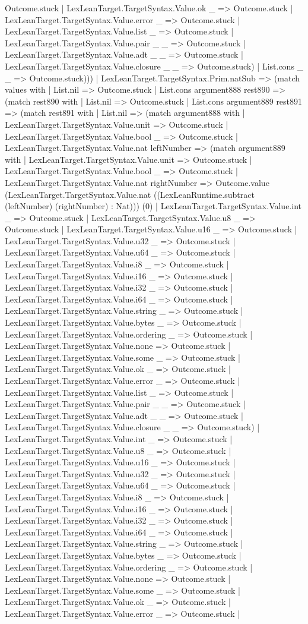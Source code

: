 \documentclass[11pt]{article}
\begin{document}
Outcome.stuck | LexLeanTarget.TargetSyntax.Value.ok \_ => Outcome.stuck | LexLeanTarget.TargetSyntax.Value.error \_ => Outcome.stuck | LexLeanTarget.TargetSyntax.Value.list \_ => Outcome.stuck | LexLeanTarget.TargetSyntax.Value.pair \_ \_ => Outcome.stuck | LexLeanTarget.TargetSyntax.Value.adt \_ \_ => Outcome.stuck | LexLeanTarget.TargetSyntax.Value.closure \_ \_ => Outcome.stuck) | List.cons \_ \_ => Outcome.stuck))) | LexLeanTarget.TargetSyntax.Prim.natSub => (match values with | List.nil => Outcome.stuck | List.cons argument888 rest890 => (match rest890 with | List.nil => Outcome.stuck | List.cons argument889 rest891 => (match rest891 with | List.nil => (match argument888 with | LexLeanTarget.TargetSyntax.Value.unit => Outcome.stuck | LexLeanTarget.TargetSyntax.Value.bool \_ => Outcome.stuck | LexLeanTarget.TargetSyntax.Value.nat leftNumber => (match argument889 with | LexLeanTarget.TargetSyntax.Value.unit => Outcome.stuck | LexLeanTarget.TargetSyntax.Value.bool \_ => Outcome.stuck | LexLeanTarget.TargetSyntax.Value.nat rightNumber => Outcome.value (LexLeanTarget.TargetSyntax.Value.nat ((LexLeanRuntime.subtract (leftNumber) (rightNumber) : Nat))) (0) | LexLeanTarget.TargetSyntax.Value.int \_ => Outcome.stuck | LexLeanTarget.TargetSyntax.Value.u8 \_ => Outcome.stuck | LexLeanTarget.TargetSyntax.Value.u16 \_ => Outcome.stuck | LexLeanTarget.TargetSyntax.Value.u32 \_ => Outcome.stuck | LexLeanTarget.TargetSyntax.Value.u64 \_ => Outcome.stuck | LexLeanTarget.TargetSyntax.Value.i8 \_ => Outcome.stuck | LexLeanTarget.TargetSyntax.Value.i16 \_ => Outcome.stuck | LexLeanTarget.TargetSyntax.Value.i32 \_ => Outcome.stuck | LexLeanTarget.TargetSyntax.Value.i64 \_ => Outcome.stuck | LexLeanTarget.TargetSyntax.Value.string \_ => Outcome.stuck | LexLeanTarget.TargetSyntax.Value.bytes \_ => Outcome.stuck | LexLeanTarget.TargetSyntax.Value.ordering \_ => Outcome.stuck | LexLeanTarget.TargetSyntax.Value.none => Outcome.stuck | LexLeanTarget.TargetSyntax.Value.some \_ => Outcome.stuck | LexLeanTarget.TargetSyntax.Value.ok \_ => Outcome.stuck | LexLeanTarget.TargetSyntax.Value.error \_ => Outcome.stuck | LexLeanTarget.TargetSyntax.Value.list \_ => Outcome.stuck | LexLeanTarget.TargetSyntax.Value.pair \_ \_ => Outcome.stuck | LexLeanTarget.TargetSyntax.Value.adt \_ \_ => Outcome.stuck | LexLeanTarget.TargetSyntax.Value.closure \_ \_ => Outcome.stuck) | LexLeanTarget.TargetSyntax.Value.int \_ => Outcome.stuck | LexLeanTarget.TargetSyntax.Value.u8 \_ => Outcome.stuck | LexLeanTarget.TargetSyntax.Value.u16 \_ => Outcome.stuck | LexLeanTarget.TargetSyntax.Value.u32 \_ => Outcome.stuck | LexLeanTarget.TargetSyntax.Value.u64 \_ => Outcome.stuck | LexLeanTarget.TargetSyntax.Value.i8 \_ => Outcome.stuck | LexLeanTarget.TargetSyntax.Value.i16 \_ => Outcome.stuck | LexLeanTarget.TargetSyntax.Value.i32 \_ => Outcome.stuck | LexLeanTarget.TargetSyntax.Value.i64 \_ => Outcome.stuck | LexLeanTarget.TargetSyntax.Value.string \_ => Outcome.stuck | LexLeanTarget.TargetSyntax.Value.bytes \_ => Outcome.stuck | LexLeanTarget.TargetSyntax.Value.ordering \_ => Outcome.stuck | LexLeanTarget.TargetSyntax.Value.none => Outcome.stuck | LexLeanTarget.TargetSyntax.Value.some \_ => Outcome.stuck | LexLeanTarget.TargetSyntax.Value.ok \_ => Outcome.stuck | LexLeanTarget.TargetSyntax.Value.error \_ => Outcome.stuck | 
\end{document}
